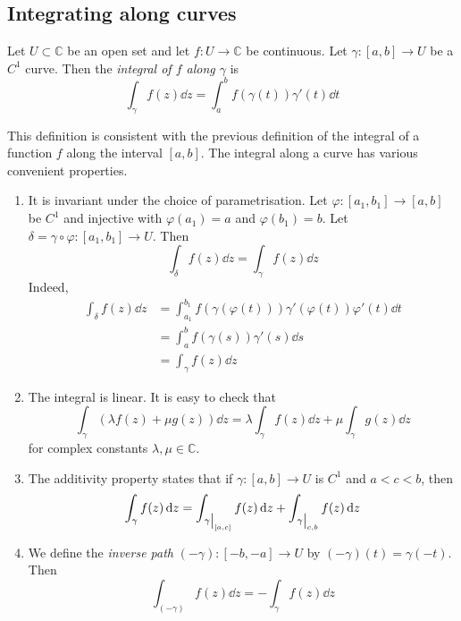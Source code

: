 \subsection{Integrating along curves}
\begin{definition}
	Let \( U \subset \mathbb C \) be an open set and let \( f \colon U \to \mathbb C \) be continuous.
	Let \( \gamma \colon [a,b] \to U \) be a \( C^1 \) curve.
	Then the \textit{integral of \( f \) along \( \gamma \)} is
	\[
		\int_\gamma f(z) \dd{z} = \int_a^b f(\gamma(t)) \gamma'(t) \dd{t}
	\]
\end{definition}
This definition is consistent with the previous definition of the integral of a function \( f \) along the interval \( [a,b] \).
The integral along a curve has various convenient properties.
\begin{enumerate}
	\item It is invariant under the choice of parametrisation.
	      Let \( \varphi \colon [a_1, b_1] \to [a,b] \) be \( C^1 \) and injective with \( \varphi(a_1) = a \) and \( \varphi(b_1) = b \).
	      Let \( \delta = \gamma \circ \varphi \colon [a_1, b_1] \to U \).
	      Then
	      \[
		      \int_\delta f(z) \dd{z} = \int_\gamma f(z) \dd{z}
	      \]
	      Indeed,
	      \begin{align*}
		      \int_\delta f(z) \dd{z} & = \int_{a_1}^{b_1} f(\gamma (\varphi(t))) \gamma'(\varphi(t)) \varphi'(t) \dd{t} \\
		                              & = \int_a^b f(\gamma(s)) \gamma'(s) \dd{s}                                        \\
		                              & = \int_\gamma f(z) \dd{z}
	      \end{align*}
	\item The integral is linear.
	      It is easy to check that
	      \[
		      \int_\gamma (\lambda f(z) + \mu g(z)) \dd{z} = \lambda \int_\gamma f(z) \dd{z} + \mu \int_\gamma g(z) \dd{z}
	      \]
	      for complex constants \( \lambda, \mu \in \mathbb C \).
	\item The additivity property states that if \( \gamma \colon[a,b] \to U \) is \( C^1 \) and \( a < c < b \), then
	      \[
		      \int_\gamma f(z) \dd{z} = \int_{\eval{\gamma}_{[a,c]}} f(z) \dd{z} + \int_{\eval{\gamma}_{c,b}} f(z) \dd{z}
	      \]
	\item We define the \textit{inverse path} \( (-\gamma) \colon [-b, -a] \to U \) by \( (-\gamma)(t) = \gamma(-t) \).
	      Then
	      \[
		      \int_{(-\gamma)} f(z) \dd{z} = - \int_\gamma f(z) \dd{z}
	      \]
\end{enumerate}
